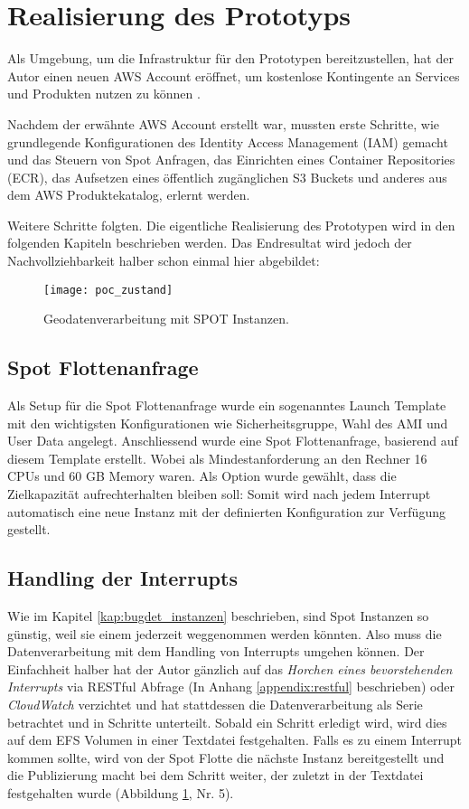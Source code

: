 \section{Realisierung des Prototyps}
Als Umgebung, um die Infrastruktur für den Prototypen bereitzustellen, hat der Autor einen neuen AWS Account eröffnet, um kostenlose Kontingente an Services und Produkten nutzen zu können \cite{FreeTier2020}.

Nachdem der erwähnte AWS Account erstellt war, mussten erste Schritte, wie grundlegende Konfigurationen des Identity Access Management (IAM) gemacht und das Steuern von Spot Anfragen, das Einrichten eines Container Repositories (ECR), das Aufsetzen eines öffentlich zugänglichen S3 Buckets und anderes aus dem AWS Produktekatalog, erlernt werden.

Weitere Schritte folgten. Die eigentliche Realisierung des Prototypen wird in den folgenden Kapiteln beschrieben werden. Das Endresultat wird jedoch der Nachvollziehbarkeit halber schon einmal hier abgebildet:

\begin{figure}[H]
	\centering
	\texttt{[image: poc\_zustand]}
	\caption{Geodatenverarbeitung mit SPOT Instanzen.}
	\label{fig:ist_zustand}
\end{figure}

\subsection{Spot Flottenanfrage}
Als Setup für die Spot Flottenanfrage wurde ein sogenanntes Launch Template mit den wichtigsten Konfigurationen wie Sicherheitsgruppe, Wahl des AMI und User Data angelegt. Anschliessend wurde eine Spot Flottenanfrage, basierend auf diesem Template erstellt. Wobei als Mindestanforderung an den Rechner 16 CPUs und 60 GB Memory waren. Als Option wurde gewählt, dass die Zielkapazität aufrechterhalten bleiben soll: Somit wird nach jedem Interrupt automatisch eine neue Instanz mit der definierten Konfiguration zur Verfügung gestellt.

\subsection{Handling der Interrupts}
Wie im Kapitel \ref{kap:bugdet_instanzen} beschrieben, sind Spot Instanzen so günstig, weil sie einem jederzeit weggenommen werden könnten. Also muss die Datenverarbeitung mit dem Handling von Interrupts umgehen können. 
Der Einfachheit halber hat der Autor gänzlich auf das \textit{Horchen eines bevorstehenden Interrupts} via RESTful Abfrage (In Anhang \ref{appendix:restful} beschrieben) oder \emph{CloudWatch} verzichtet und hat stattdessen die Datenverarbeitung als Serie betrachtet und in Schritte unterteilt. Sobald ein Schritt erledigt wird, wird dies auf dem EFS Volumen in einer Textdatei festgehalten. Falls es zu einem Interrupt kommen sollte, wird von der Spot Flotte die nächste Instanz bereitgestellt und die Publizierung macht bei dem Schritt weiter, der zuletzt in der Textdatei festgehalten wurde (Abbildung \ref{fig:ist_zustand}, Nr. 5).

